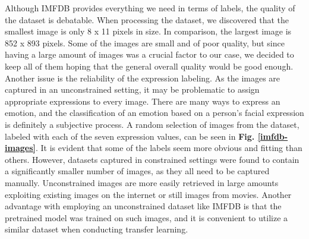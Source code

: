 \noindent Although IMFDB provides everything we need in terms of labels, the quality of the dataset is debatable. When processing the dataset, we discovered that the smallest image is only 8 x 11 pixels in size. In comparison, the largest image is 852 x 893 pixels. Some of the images are small and of poor quality, but since having a large amount of images was a crucial factor to our case, we decided to keep all of them hoping that the general overall quality would be good enough. Another issue is the reliability of the expression labeling. As the images are captured in an unconstrained setting, it may be problematic to assign appropriate expressions to every image. There are many ways to express an emotion, and the classification of an emotion based on a person's facial expression is definitely a subjective process. A random selection of images from the dataset, labeled with each of the seven expression values, can be seen in \textbf{Fig. \ref{imfdb-images}}. It is evident that some of the labels seem more obvious and fitting than others. However, datasets captured in constrained settings were found to contain a significantly smaller number of images, as they all need to be captured manually. Unconstrained images are more easily retrieved in large amounts exploiting existing images on the internet or still images from movies. Another advantage with employing an unconstrained dataset like IMFDB is that the pretrained model was trained on such images, and it is convenient to utilize a similar dataset when conducting transfer learning.

